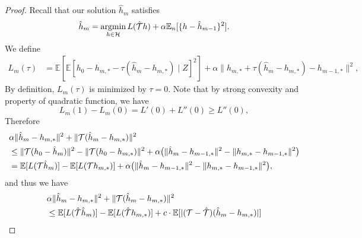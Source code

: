 \begin{proof}
    Recall that our solution $\hat{h}_{m}$ satisfies $$
\hat{h}_{m} = \mathop{\mathrm{argmin}}_{h\in\mathcal{H}} L(\hat{{\mathcal{T}}}h) + \alpha \mathbb{E}_n [\{h - \hat{h}_{m-1}\}^2].
$$
We define \begin{align*}
L_m(\tau) &= \mathbb{E}[\mathbb{E}[h_0 - h_{m,*} - \tau (\hat{h}_{m} - h_{m,*})\mid Z]^2]+\alpha \|h_{m,*} + \tau (\hat{h}_{m} - h_{m,*}) - h_{m-1,*}\|^2,
\end{align*}
By definition, $L_m(\tau)$ is minimized by $\tau = 0$. Note that by strong convexity and property of quadratic function, we have $$
L_m(1) - L_m(0) = L'(0) + L''(0) \geq L''(0),
$$
Therefore \begin{align*}
    &\alpha \|\hat{h}_{m} - h_{m,*}\|^2 + \|{\mathcal{T}}(\hat{h}_{m} - h_{m,*})\|^2\\
    & \leq\|{\mathcal{T}}(h_0 - \hat{h}_{m})\|^2 - \|{\mathcal{T}}(h_0 - h_{m,*})\|^2 + \alpha\big(\|\hat{h}_{m} - h_{m-1,*}\|^2 - \|h_{m,*} - h_{m-1,*}\|^2\big)\\
    & =\mathbb{E}[L({\mathcal{T}}\hat{h}_{m})] - \mathbb{E}[L({\mathcal{T}} h_{m,*})]+ \alpha\big(\|\hat{h}_{m} - h_{m-1,*}\|^2 - \|h_{m,*} - h_{m-1,*}\|^2\big),\\
\end{align*}
and thus we have \begin{align*}
&\alpha \|\hat{h}_{m} - h_{m,*}\|^2 + \|\Tcal(\hat{h}_{m} - h_{m,*})\|^2\\
    & \leq \mathbb{E}[L(\hat{\Tcal}\hat{h}_{m})] - \mathbb{E}[L(\hat{\Tcal} h_{m,*})] + c\cdot\mathbb{E}[|(\Tcal - \hat{\Tcal})(\hat{h}_{m} - h_{m,*})|]\\

\end{align*}
\end{proof}
